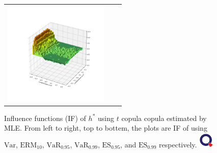 \begin{figure}[h!t]
\begin{tabular}[width=20cm, height=20cm]{ccc}
   \includegraphics[height=5cm]{_pics/IF_plots/ES1_t_copula_MLE.pdf}
   \end{tabular}
   \caption{Influence functions (IF) of $h^*$ using $t$ copula copula estimated by MLE. From left to right, top to bottem, the plots are
   IF of using $\text{Var}$, $\text{ERM}_{10}$, $\text{VaR}_{0.95}$, $\text{VaR}_{0.99}$, $\text{ES}_{0.95}$, and $\text{ES}_{0.99}$ respectively.
   \href{http://www.quantlet.com/}{\includegraphics[width=20pt]{_pics/qletlogo_tr.png}}}
   \label{fig:IFs}
\end{figure}
